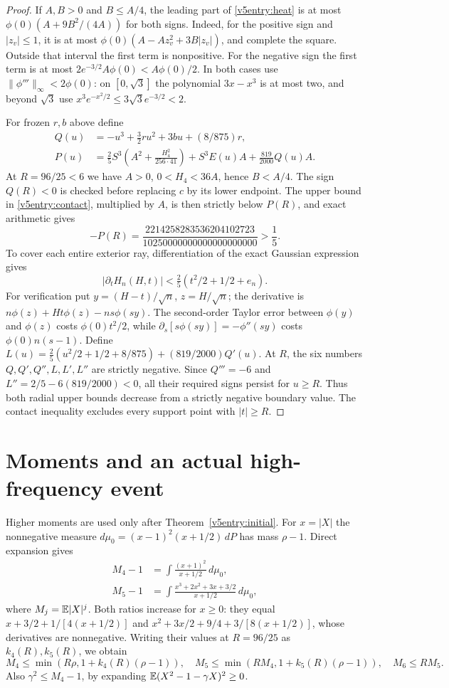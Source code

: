 \begin{proof}
If $A,B>0$ and $B\le A/4$, the leading part of \eqref{v5entry:heat}
is at most $\phi(0)(A+9B^2/(4A))$ for both signs. Indeed, for the
positive sign and $|z_v|\le1$, it is at most
$\phi(0)(A-Az_v^2+3B|z_v|)$, and complete the square. Outside that
interval the first term is nonpositive. For the negative sign the first
term is at most $2e^{-3/2}A\phi(0)<A\phi(0)/2$. In both cases use
$\|\phi'''\|_\infty<2\phi(0)$: on $[0,\sqrt3]$ the polynomial
$3x-x^3$ is at most two, and beyond $\sqrt3$ use
$x^3e^{-x^2/2}\le3\sqrt3e^{-3/2}<2$.

For frozen $r,b$ above define
\begin{align*}
 Q(u)&=-u^3+\tfrac32ru^2+3bu+(8/875)r,\\
 P(u)&=\tfrac25 S^3\left(A^2+\frac{H_4^2}{256\cdot41}\right)
                         +S^3E(u)A+\frac{819}{2000}Q(u)A.
\end{align*}
At $R=96/25<6$ we have $A>0$, $0<H_4<36A$, hence $B<A/4$.
The sign $Q(R)<0$ is checked before replacing $c$ by its lower endpoint.
The upper bound in \eqref{v5entry:contact}, multiplied by $A$, is then
strictly below $P(R)$, and exact arithmetic gives
\[
 -P(R)=\frac{2214258283536204102723}{10250000000000000000000}>\frac15.
\]
To cover each entire exterior ray, differentiation of the exact Gaussian
expression gives
\[
 |\partial_tH_n(H,t)|<\tfrac25(t^2/2+1/2+e_n).
\]
For verification put $y=(H-t)/\sqrt n$, $z=H/\sqrt n$; the derivative is
$n\phi(z)+Ht\phi(z)-ns\phi(sy)$. The second-order Taylor error between
$\phi(y)$ and $\phi(z)$ costs $\phi(0)t^2/2$, while
$\partial_s[s\phi(sy)]=-\phi''(sy)$ costs $\phi(0)n(s-1)$.
Define $L(u)=\tfrac25(u^2/2+1/2+8/875)+(819/2000)Q'(u)$.
At $R$, the six numbers $Q,Q',Q'',L,L',L''$ are strictly negative.
Since $Q'''=-6$ and $L''=2/5-6(819/2000)<0$, all their required signs
persist for $u\ge R$. Thus both radial upper bounds decrease from a
strictly negative boundary value. The contact inequality excludes every
support point with $|t|\ge R$.
\end{proof}

\section{Moments and an actual high-frequency event}
\label{v5entry:moments}
Higher moments are used only after Theorem~\ref{v5entry:initial}.
For $x=|X|$ the nonnegative measure
$d\mu_0=(x-1)^2(x+1/2)\,dP$ has mass $\rho-1$. Direct expansion gives
\begin{align*}
 M_4-1&=\int\frac{(x+1)^2}{x+1/2}\,d\mu_0,\\
 M_5-1&=\int\frac{x^3+2x^2+3x+3/2}{x+1/2}\,d\mu_0,
\end{align*}
where $M_j=\mathbb E|X|^j$. Both ratios increase for $x\ge0$: they equal
$x+3/2+1/[4(x+1/2)]$ and
$x^2+3x/2+9/4+3/[8(x+1/2)]$, whose derivatives are nonnegative.
Writing their values at $R=96/25$ as $k_4(R),k_5(R)$, we obtain
\begin{equation}\label{v5entry:mom}
 M_4\le\min(R\rho,1+k_4(R)(\rho-1)),\quad
 M_5\le\min(RM_4,1+k_5(R)(\rho-1)),\quad M_6\le RM_5.
\end{equation}
Also $\gamma^2\le M_4-1$, by expanding
$\mathbb E(X^2-1-\gamma X)^2\ge0$.

